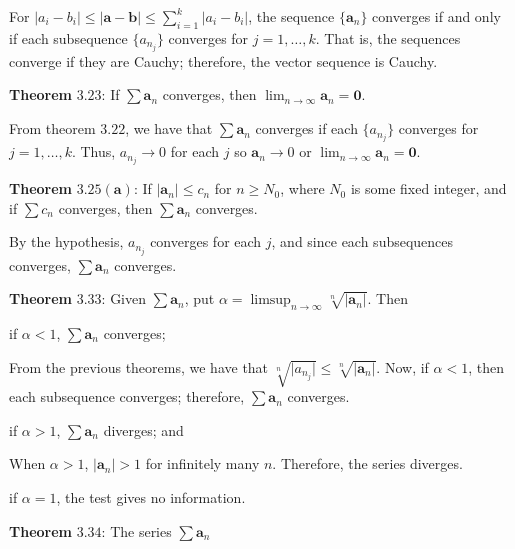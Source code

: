 \begin{exercise}
  For \(\lvert a_i - b_i\rvert\leq\lvert\mathbold{a} - \mathbold{b}\rvert\leq
  \sum_{i = 1}^k\lvert a_i - b_i\rvert\), the sequence \(\{\mathbold{a}_n\}\)
  converges if and only if each subsequence \(\{a_{n_j}\}\) converges for
  \(j = 1,\ldots,k\).
  That is, the sequences converge if they are Cauchy; therefore, the vector
  sequence is Cauchy.
  \par\smallskip
  \textbf{Theorem} \(\mathbold{3.23}\): If \(\sum\mathbold{a}_n\) converges,
  then \(\lim_{n\to\infty}\mathbold{a}_n = \mathbold{0}\).
  \par\smallskip
  From theorem \(3.22\), we have that \(\sum\mathbold{a}_n\) converges if each
  \(\{a_{n_j}\}\) converges for \(j = 1,\ldots,k\).
  Thus, \(a_{n_j}\to 0\) for each \(j\) so \(\mathbold{a}_n\to 0\) or
  \(\lim_{n\to\infty}\mathbold{a}_n = \mathbold{0}\).
  \par\smallskip
  \textbf{Theorem} \(\mathbold{3.25(a)}\): If
  \(\lvert\mathbold{a}_n\rvert\leq c_n\) for \(n\geq N_0\), where \(N_0\) is
  some fixed integer, and if \(\sum c_n\) converges, then
  \(\sum\mathbold{a}_n\) converges.
  \par\smallskip
  By the hypothesis, \(a_{n_j}\) converges for each \(j\), and since each
  subsequences converges, \(\sum\mathbold{a}_n\) converges.
  \par\smallskip
  \textbf{Theorem} \(\mathbold{3.33}\): Given \(\sum\mathbold{a}_n\), put
  \(\alpha = \limsup_{n\to\infty}\sqrt[n]{\lvert\mathbold{a}_n\vert}\).
  Then
  \begin{exercise}[label = (\alph*)]
  \item
    if \(\alpha < 1\), \(\sum\mathbold{a}_n\) converges;
    \par\smallskip
    From the previous theorems, we have that
    \(\sqrt[n]{\lvert a_{n_j}\rvert}\leq\sqrt[n]{\lvert\mathbold{a}_n\rvert}\).
    Now, if \(\alpha < 1\), then each subsequence converges; therefore,
    \(\sum\mathbold{a}_n\) converges.
  \item
    if \(\alpha > 1\), \(\sum\mathbold{a}_n\) diverges; and
    \par\smallskip
    When \(\alpha > 1\), \(\lvert\mathbold{a}_n\rvert > 1\) for infinitely
    many \(n\).
    Therefore, the series diverges.
  \item
    if \(\alpha = 1\), the test gives no information.
  \end{exercise}
  \textbf{Theorem} \(\mathbold{3.34}\): The series \(\sum\mathbold{a}_n\)
  \begin{exercise}[label = (\alph*)]

\end{exercise}
\end{exercise}
